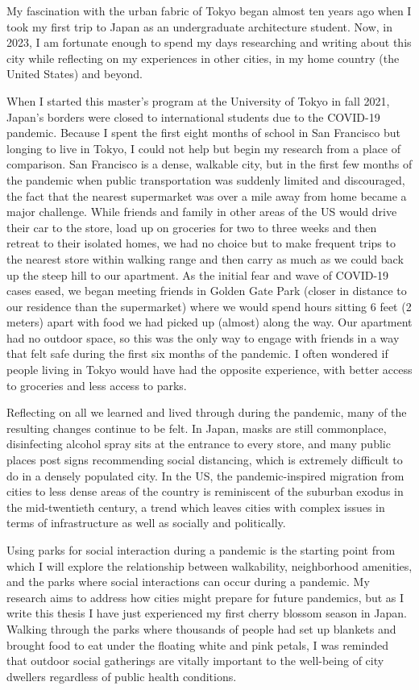 \noindent My fascination with the urban fabric of Tokyo began almost ten years ago when I took my first trip to Japan as an undergraduate architecture student. Now, in 2023, I am fortunate enough to spend my days researching and writing about this city while reflecting on my experiences in other cities, in my home country (the United States) and beyond.

\noindent When I started this master's program at the University of Tokyo in fall 2021, Japan's borders were closed to international students due to the COVID-19 pandemic. Because I spent the first eight months of school in San Francisco but longing to live in Tokyo, I could not help but begin my research from a place of comparison. San Francisco is a dense, walkable city, but in the first few months of the pandemic when public transportation was suddenly limited and discouraged, the fact that the nearest supermarket was over a mile away from home became a major challenge. While friends and family in other areas of the US would drive their car to the store, load up on groceries for two to three weeks and then retreat to their isolated homes, we had no choice but to make frequent trips to the nearest store within walking range and then carry as much as we could back up the steep hill to our apartment. As the initial fear and wave of COVID-19 cases eased, we began meeting friends in Golden Gate Park (closer in distance to our residence than the supermarket) where we would spend hours sitting 6 feet (2 meters) apart with food we had picked up (almost) along the way. Our apartment had no outdoor space, so this was the only way to engage with friends in a way that felt safe during the first six months of the pandemic. I often wondered if people living in Tokyo would have had the opposite experience, with better access to groceries and less access to parks.

\noindent Reflecting on all we learned and lived through during the pandemic, many of the resulting changes  continue to be felt. In Japan, masks are still commonplace, disinfecting alcohol spray sits at the entrance to every store, and many public places post signs recommending social distancing, which is extremely difficult to do in a densely populated city. In the US, the pandemic-inspired migration from cities to less dense areas of the country is reminiscent of the suburban exodus in the mid-twentieth century, a trend which leaves cities with complex issues in terms of infrastructure as well as socially and politically. 

\noindent Using parks for social interaction during a pandemic is the starting point from which I will explore the relationship between walkability, neighborhood amenities, and the parks where social interactions can occur during a pandemic. My research aims to address how cities  might prepare for future pandemics, but as I write this thesis I have just experienced my first cherry blossom season in Japan. Walking through the parks where thousands of people had set up blankets and brought food to eat under the floating white and pink petals, I was reminded that outdoor social gatherings are vitally important to the well-being of city dwellers regardless of public health conditions. 